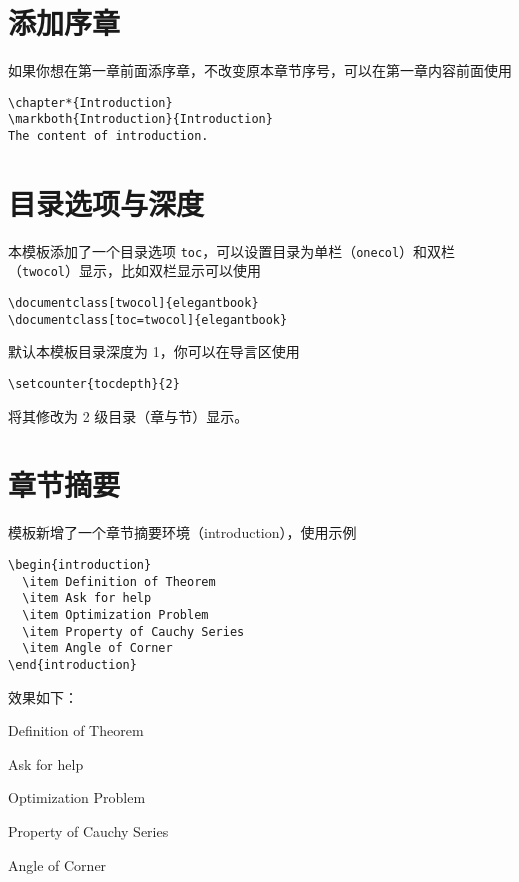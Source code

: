 \documentclass[lang=cn,newtx,10pt,scheme=chinese,color=black]{elegantbook}
\begin{document}
\section{添加序章}

如果你想在第一章前面添序章，不改变原本章节序号，可以在第一章内容前面使用 
\begin{lstlisting}
\chapter*{Introduction}
\markboth{Introduction}{Introduction}
The content of introduction.
\end{lstlisting}

\section{目录选项与深度}
本模板添加了一个目录选项 \lstinline{toc}，可以设置目录为单栏（\lstinline{onecol}）和双栏（\lstinline{twocol}）显示，比如双栏显示可以使用
\begin{lstlisting}
\documentclass[twocol]{elegantbook}
\documentclass[toc=twocol]{elegantbook}
\end{lstlisting}

默认本模板目录深度为 1，你可以在导言区使用
\begin{lstlisting}
\setcounter{tocdepth}{2}
\end{lstlisting}
将其修改为 2 级目录（章与节）显示。


\section{章节摘要}
模板新增了一个章节摘要环境（introduction），使用示例
\begin{lstlisting}
\begin{introduction}
  \item Definition of Theorem
  \item Ask for help
  \item Optimization Problem
  \item Property of Cauchy Series
  \item Angle of Corner
\end{introduction}
\end{lstlisting}
效果如下：
\begin{introduction}
  \item Definition of Theorem
  \item Ask for help
  \item Optimization Problem
  \item Property of Cauchy Series
  \item Angle of Corner
\end{introduction}
\end{document}
